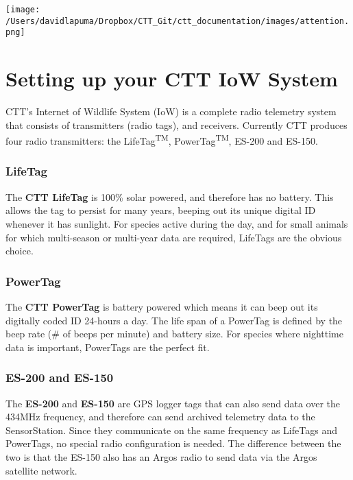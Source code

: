 \documentclass[
]{article}
\begin{document}
\texttt{[image: /Users/davidlapuma/Dropbox/CTT\_Git/ctt\_documentation/images/attention.png]}

\hypertarget{setting-up-your-ctt-iow-system}{%
\section{Setting up your CTT IoW
System}\label{setting-up-your-ctt-iow-system}}

CTT's Internet of Wildlife System (IoW) is a complete radio telemetry
system that consists of transmitters (radio tags), and receivers.
Currently CTT produces four radio transmitters: the
LifeTag\textsuperscript{TM}, PowerTag\textsuperscript{TM}, ES-200 and
ES-150.

\hypertarget{lifetag}{%
\subsubsection{LifeTag}\label{lifetag}}

The \textbf{CTT LifeTag} is 100\% solar powered, and therefore has no
battery. This allows the tag to persist for many years, beeping out its
unique digital ID whenever it has sunlight. For species active during
the day, and for small animals for which multi-season or multi-year data
are required, LifeTags are the obvious choice.

\hypertarget{powertag}{%
\subsubsection{PowerTag}\label{powertag}}

The \textbf{CTT PowerTag} is battery powered which means it can beep out
its digitally coded ID 24-hours a day. The life span of a PowerTag is
defined by the beep rate (\# of beeps per minute) and battery size. For
species where nighttime data is important, PowerTags are the perfect
fit.

\hypertarget{es-200-and-es-150}{%
\subsubsection{ES-200 and ES-150}\label{es-200-and-es-150}}

The \textbf{ES-200} and \textbf{ES-150} are GPS logger tags that can
also send data over the 434MHz frequency, and therefore can send
archived telemetry data to the SensorStation. Since they communicate on
the same frequency as LifeTags and PowerTags, no special radio
configuration is needed. The difference between the two is that the
ES-150 also has an Argos radio to send data via the Argos satellite
network.
\end{document}
